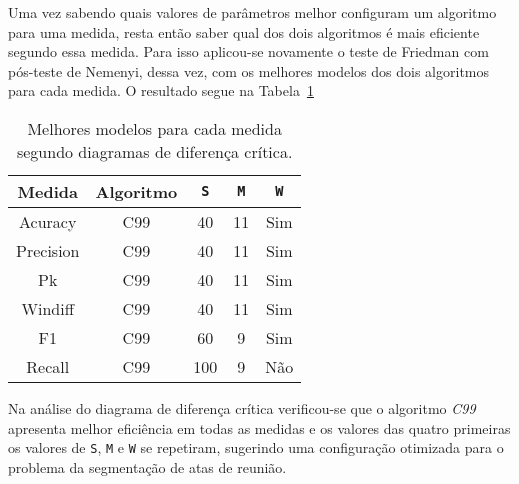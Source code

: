 Uma vez sabendo quais valores de parâmetros melhor configuram um algoritmo para uma medida, resta então saber qual dos dois algoritmos é mais eficiente segundo essa medida. Para isso aplicou-se novamente o teste de Friedman com pós-teste de Nemenyi, dessa vez, com os melhores modelos dos dois algoritmos para cada medida. O resultado segue na Tabela~\ref{tab:melhoresmodelos}

\begin{table}[!h]
	\centering
	
	\begin{tabular}{|c|c|c|c|c|}

		\hline
		Medida & Algoritmo & \texttt{S} & \texttt{M} & \texttt{W}\\		
		\hline
		
	
		Acuracy		& C99 & 40 	& 11	& Sim \\ \hline
		Precision	& C99 & 40 	& 11	& Sim \\ \hline
		Pk			& C99 & 40 	& 11	& Sim \\ \hline
		Windiff		& C99 & 40 	& 11	& Sim \\ \hline
		F1			& C99 & 60 	& 9		& Sim \\ \hline
		Recall		& C99 & 100 & 9		& Não \\ \hline
 	
	
	\end{tabular}

	\caption{Melhores modelos para cada medida segundo diagramas de diferença crítica.}
	\label{tab:melhoresmodelos}	
	
\end{table}


Na análise do diagrama de diferença crítica verificou-se que o algoritmo \textit{C99} apresenta melhor eficiência em todas as medidas e os valores das quatro primeiras os valores de \texttt{S}, \texttt{M} e \texttt{W} se repetiram, sugerindo uma configuração otimizada para o problema da segmentação de atas de reunião.










